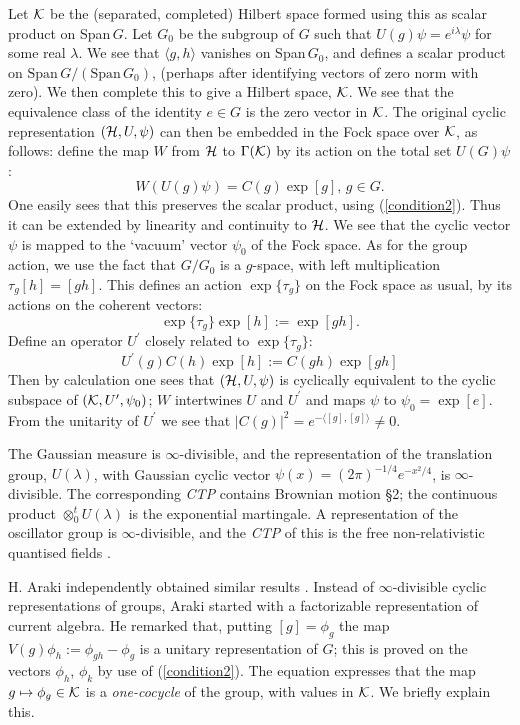 Let ${\cal K}$ be the (separated, completed) Hilbert space formed using this
as scalar product on Span$\,G$. Let $G_0$ be the subgroup of $G$ such that
$U(g)\psi=e^{i\lambda}\psi$ for some real $\lambda$. We see that
$\langle g,h\rangle$ vanishes on Span$\,G_0$, and
defines a scalar product
on $\mbox{Span}\,G/(\mbox{Span}\,G_0)$, (perhaps after
identifying vectors of zero norm with zero).
We then complete this to give a Hilbert space, ${\cal K}$. We see that the
equivalence class of the identity $e\in G$ is the zero vector
in ${\cal K}$. The original
cyclic representation $({\cal H},U,\psi)$ can then be embedded in the Fock
space over ${\cal K}$, as follows: define the map $W$ from ${\cal H}$ to
$\Gamma({\cal K})$ by its action on the total set $U(G)\psi$:
\begin{equation}
W(U(g)\psi)=C(g)\exp[g],\,g\in G.
\end{equation}
One easily sees that this preserves the scalar product, using
(\ref{condition2}). Thus it can be extended by linearity and continuity
to ${\cal H}$. We see that the cyclic vector $\psi$ is mapped to the
`vacuum' vector $\psi_0$ of the Fock space. As for the group
action, we use the fact that $G/G_0$ is a $g$-space, with left multiplication
$\tau_g[h]=[gh]$. This defines an action $\exp\{\tau_g\}$ on the Fock space
as usual, by its actions on the coherent vectors:
\[\exp\{\tau_g\}\exp[h]:=\exp[gh] .\]
Define an operator $U^\prime$ closely related to $\exp\{\tau_g\}$:
\begin{equation}
U^\prime(g)C(h)\exp[h]:=C(gh)\exp[gh]
\label{embed}
\end{equation}
Then by calculation one sees that $({\cal H},U,\psi)$ is cyclically
equivalent to the cyclic subspace of $({\cal K},U^\prime,\psi_0)$; $W$
intertwines $U$ and $U^\prime$ and maps $\psi$ to $\psi_0=\exp[e]$.
From the unitarity of $U^\prime$ we see that
$|C(g)|^2=e^{-\langle[g],[g]\rangle}\neq0$.

The Gaussian measure is $\infty$-divisible, and the representation
of the translation group, $U(\lambda)$,
with Gaussian cyclic vector $\psi(x)=(2\pi)^{-1/4}e^{-x^2/4}$, is
$\infty$-divisible. The corresponding {\em CTP} contains Brownian
motion  \S2; the continuous product $\otimes_0^tU(\lambda)$ is the
exponential martingale. A representation
of the oscillator group is $\infty$-divisible, and the {\em CTP}
of this is the free non-relativistic quantised fields \cite{RFS3}.

H. Araki independently obtained similar results \cite{Araki}. Instead of
$\infty$-divisible cyclic representations of groups, Araki started with
a factorizable representation of current algebra.
He remarked that, putting $[g]=\phi_g$
the map $V(g)\phi_h:=\phi_{gh}-\phi_g$ 
is a unitary representation of $G$; this is proved on the vectors
$\phi_h$, $\phi_k$ by use of (\ref{condition2}). The equation
expresses that the
map $g\mapsto \phi_g\in{\cal K}$ is a {\em one-cocycle} of the group, with
values in ${\cal K}$. We briefly explain this.

